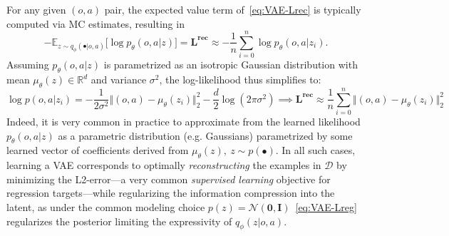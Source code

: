 For any given \((o,a) \) pair, the expected value term of~\ref{eq:VAE-Lrec} is typically computed via MC estimates, resulting in
\[ 
-\mathbb{E}_{z \sim q_\phi(\bullet \vert o,a)} \big[ \log p_\theta(o,a \vert z) \big] = \mathbf{L^{\text{rec}}} \approx - \frac{1}{n} \sum_{i=0}^n \log p_\theta(o,a \vert z_i).
\]
Assuming \( p_\theta(o,a \vert z) \) is parametrized as an isotropic Gaussian distribution with mean \(\mu_\theta (z) \in \mathbb R^d \) and variance \( \sigma^2 \), the log-likelihood thus simplifies to:
\[
\log p(o,a \vert z_i) = -\frac{1}{2\sigma^{2}} \big \Vert (o,a)-\mu_\theta(z_i) \big\Vert_2^2 -\frac{d}{2}\log(2\pi \sigma^{2}) \implies \mathbf{L^\text{rec}} \approx \frac {1}{n} \sum_{i=0}^n \big\Vert (o,a) - \mu_\theta(z_i) \big \Vert^2_2
\]
Indeed, it is very common in practice to approximate from the learned likelihood \( p_\theta(o,a \vert z) \) as a parametric distribution (e.g. Gaussians) parametrized by some learned vector of coefficients derived from \(\mu_\theta (z), \ z \sim p (\bullet) \).
In all such cases, learning a VAE corresponds to optimally \emph{reconstructing} the examples in \( \mathcal D \) by minimizing the L2-error---a very common \emph{supervised learning} objective for regression targets---while regularizing the information compression into the latent, as under the common modeling choice \( p(z) = \mathcal N (\mathbf{0}, \mathbf{I}) \)~\ref{eq:VAE-Lreg} regularizes the posterior limiting the expressivity of \( q_\phi(z\vert o,a) \).

